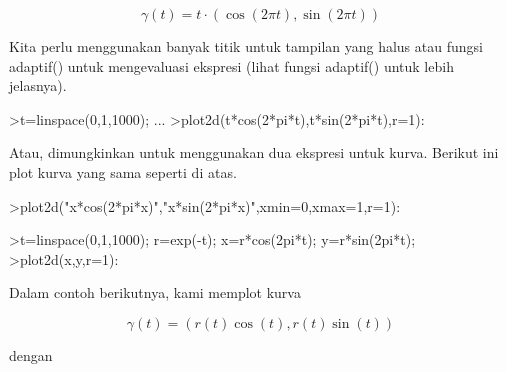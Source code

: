 \documentclass{article}
\begin{document}
\begin{eulernotebook}
\begin{eulercomment}
\begin{eulercomment}
\begin{eulercomment}
\begin{eulercomment}
\begin{eulercomment}
\begin{eulercomment}
\begin{eulercomment}
\begin{eulercomment}
\begin{eulercomment}
\begin{eulercomment}
\begin{eulercomment}
\begin{eulercomment}
\begin{eulercomment}
\begin{eulercomment}
\begin{eulercomment}
\begin{eulercomment}
\begin{eulercomment}
\begin{eulercomment}
\begin{eulercomment}
\begin{eulercomment}
\begin{eulercomment}
\begin{eulercomment}
\begin{eulercomment}
\begin{eulercomment}
\begin{eulercomment}
\begin{eulercomment}
\begin{eulercomment}
\end{eulercomment}
\begin{eulerformula}
\[
\gamma(t) = t \cdot (\cos(2\pi t),\sin(2\pi t))
\]
\end{eulerformula}
\begin{eulercomment}
Kita perlu menggunakan banyak titik untuk tampilan yang halus atau
fungsi adaptif() untuk mengevaluasi ekspresi (lihat fungsi adaptif()
untuk lebih jelasnya).
\end{eulercomment}
\begin{eulerprompt}
>t=linspace(0,1,1000); ...
>plot2d(t*cos(2*pi*t),t*sin(2*pi*t),r=1):
\end{eulerprompt}
\begin{eulercomment}
Atau, dimungkinkan untuk menggunakan dua ekspresi untuk kurva. Berikut
ini plot kurva yang sama seperti di atas.
\end{eulercomment}
\begin{eulerprompt}
>plot2d("x*cos(2*pi*x)","x*sin(2*pi*x)",xmin=0,xmax=1,r=1):
\end{eulerprompt}
\begin{eulerprompt}
>t=linspace(0,1,1000); r=exp(-t); x=r*cos(2pi*t); y=r*sin(2pi*t);
>plot2d(x,y,r=1):
\end{eulerprompt}
\begin{eulercomment}
Dalam contoh berikutnya, kami memplot kurva

\end{eulercomment}
\begin{eulerformula}
\[
\gamma(t) = (r(t) \cos(t), r(t) \sin(t))
\]
\end{eulerformula}
\begin{eulercomment}
dengan


\end{eulercomment}
\end{eulercomment}
\end{eulercomment}
\end{eulercomment}
\end{eulercomment}
\end{eulercomment}
\end{eulercomment}
\end{eulercomment}
\end{eulercomment}
\end{eulercomment}
\end{eulercomment}
\end{eulercomment}
\end{eulercomment}
\end{eulercomment}
\end{eulercomment}
\end{eulercomment}
\end{eulercomment}
\end{eulercomment}
\end{eulercomment}
\end{eulercomment}
\end{eulercomment}
\end{eulercomment}
\end{eulercomment}
\end{eulercomment}
\end{eulercomment}
\end{eulercomment}
\end{eulercomment}
\end{eulernotebook}
\end{document}
